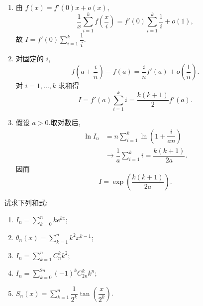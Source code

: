 \begin{solution}
    \leavevmode
    \begin{enumerate}
        \item 由 $f(x)=f'(0)x+o(x)$,
              \[
                  \dfrac{1}{x}\sum\limits_{i=1}^{k}f\left(\dfrac{x}{i}\right)
                  =f'(0)\sum\limits_{i=1}^{k}\dfrac{1}{i}+o(1),
              \]
              故 $I=f'(0)\displaystyle\sum\limits_{i=1}^{k}\dfrac{1}{i}$.
        \item 对固定的 $i$,
              \[
                  f\left(a+\dfrac{i}{n}\right)-f(a)
                  =\dfrac{i}{n}f'(a)+o\left(\dfrac{1}{n}\right).
              \]
              对 $i=1,\ldots,k$ 求和得
              \[
                  I=f'(a)\sum\limits_{i=1}^{k}i
                  =\dfrac{k(k+1)}{2}f'(a).
              \]
        \item 假设 $a>0$.取对数后,
              \[
                  \begin{aligned}
                      \ln I_n
                       & =n\sum\limits_{i=1}^{k}
                      \ln\left(1+\dfrac{i}{an}\right)                      \\
                       & \longrightarrow\dfrac{1}{a}\sum\limits_{i=1}^{k}i
                      =\dfrac{k(k+1)}{2a}.
                  \end{aligned}
              \]
              因而
              \[
                  I=\exp\left(\dfrac{k(k+1)}{2a}\right).
              \]
    \end{enumerate}
\end{solution}

\begin{example}
    试求下列和式:
    \begin{enumerate}
        \item $\displaystyle I_n=\sum\limits_{k=0}^n ke^{kx}$;
        \item $\displaystyle \theta_n(x)=\sum\limits_{k=1}^n k^2x^{k-1}$;
        \item $\displaystyle I_n=\sum\limits_{k=1}^n C_{n}^{k}k^2$;
        \item $\displaystyle I_n=\sum\limits_{k=0}^{2n}(-1)^k C_{2n}^{k}k^n$;
        \item $\displaystyle S_n(x)=\sum\limits_{k=1}^n\dfrac{1}{2^k}\tan\left(\dfrac{x}{2^k}\right)$.
    \end{enumerate}
\end{example}
\exampleblank

